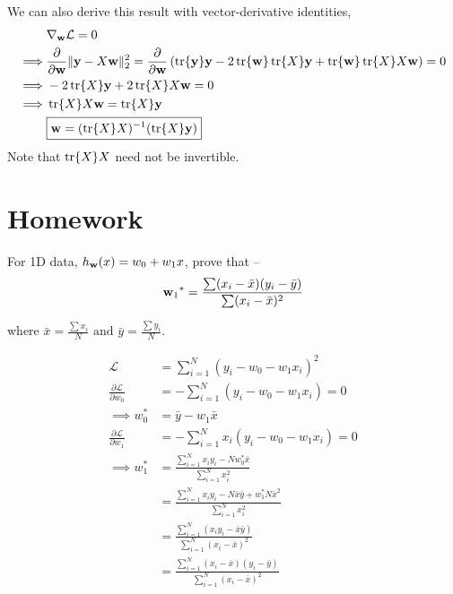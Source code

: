 We can also derive this result with vector-derivative identities\footnotemark[1],
\begin{align*}
           & \nabla_{\mathbf{w}}\mathcal{L} = 0                                                                                                                                       \\
  \implies & \frac{\partial }{\partial \mathbf{w}} \lVert \mathbf{y}-X\mathbf{w}\rVert_2^2 = \frac{\partial}{\partial \mathbf{w}}\left(\tr{\mathbf{y}}\mathbf{y} - 2\tr{\mathbf{w}} \tr{X} \mathbf{y} + \tr{\mathbf{w}} \tr{X} X\mathbf{w}\right) = 0 \\
  \implies & -2\tr{X} \mathbf{y} + 2\tr{X}X\mathbf{w} = 0                                                                                                                             \\
  \implies & \tr{X}X\mathbf{w} = \tr{X}\mathbf{y}                                                                                                                                     \\
           & \boxed{\mathbf{w} = (\tr{X} X)^{-1}(\tr{X} \mathbf{y})}
\end{align*}
Note that \(\tr{X}X\) need not be invertible.

\section{Homework}
For 1D data, $ h_{\mathbf{w}}(x)=w_0+w_1 x $,
prove that --
\begin{equation*}
  {\mathbf{w}_1}^* = \frac{\sum (x_i-\bar{x})(y_i-\bar{y})}{\sum (x_i-\bar{x})^2}
\end{equation*}

where \(\bar{x} = \frac{\sum{x_i}}{N} \text{ \ and \ } \bar{y} = \frac{\sum{y_i}}{N}\).

\begin{solution}
  \begin{align*}
    \mathcal{L}                               & = \sum_{i=1}^N (y_i-w_0-w_1x_i)^2                                                     \\
    \frac{\partial \mathcal{L}}{\partial w_0} & = - \sum_{i=1}^N (y_i-w_0-w_1x_i) = 0                                                 \\
    \implies  w_0^*                           & = \bar{y} - w_1\bar{x}                                                                \\
    \frac{\partial \mathcal{L}}{\partial w_1} & = - \sum_{i=1}^N x_i(y_i-w_0-w_1x_i) = 0                                              \\
    \implies w_1^*                            & = \frac{\sum_{i=1}^N x_iy_i - Nw_0^*\bar{x}} {\sum_{i=1}^N x_i^2}                     \\
                                              & = \frac{\sum_{i=1}^N x_iy_i - N\bar{x}\bar{y} + w_1^*N\bar{x}^2} {\sum_{i=1}^N x_i^2} \\
                                              & = \frac{\sum_{i=1}^N (x_iy_i - \bar{x}\bar{y})} {\sum_{i=1}^N (x_i-\bar{x})^2}        \\
                                              & = \frac{\sum_{i=1}^N (x_i-\bar{x})(y_i-\bar{y})} {\sum_{i=1}^N (x_i-\bar{x})^2}
  \end{align*}
\end{solution}

